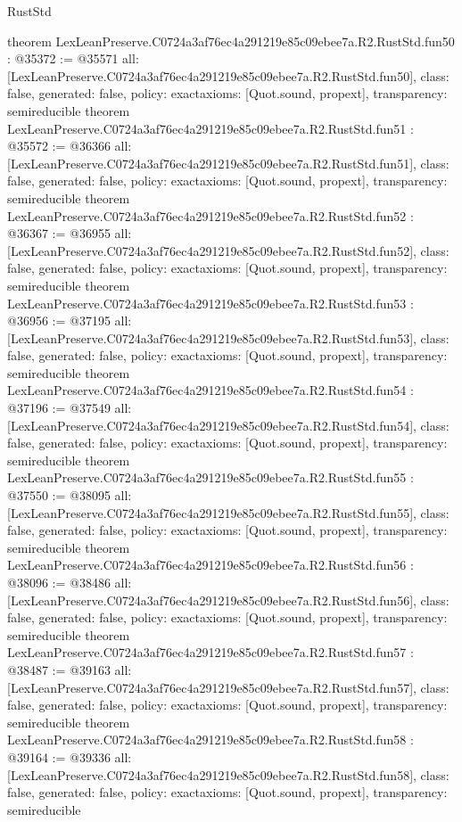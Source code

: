 \begin{lexlean}{RustStd}
\begin{coremodule}
{}
theorem LexLeanPreserve.C0724a3af76ec4a291219e85c09ebee7a.R2.RustStd.fun50 : @35372 := @35571 {
  all: [LexLeanPreserve.C0724a3af76ec4a291219e85c09ebee7a.R2.RustStd.fun50],
  class: false,
  generated: false,
  policy: exact{axioms: [Quot.sound, propext]},
  transparency: semireducible
}
theorem LexLeanPreserve.C0724a3af76ec4a291219e85c09ebee7a.R2.RustStd.fun51 : @35572 := @36366 {
  all: [LexLeanPreserve.C0724a3af76ec4a291219e85c09ebee7a.R2.RustStd.fun51],
  class: false,
  generated: false,
  policy: exact{axioms: [Quot.sound, propext]},
  transparency: semireducible
}
theorem LexLeanPreserve.C0724a3af76ec4a291219e85c09ebee7a.R2.RustStd.fun52 : @36367 := @36955 {
  all: [LexLeanPreserve.C0724a3af76ec4a291219e85c09ebee7a.R2.RustStd.fun52],
  class: false,
  generated: false,
  policy: exact{axioms: [Quot.sound, propext]},
  transparency: semireducible
}
theorem LexLeanPreserve.C0724a3af76ec4a291219e85c09ebee7a.R2.RustStd.fun53 : @36956 := @37195 {
  all: [LexLeanPreserve.C0724a3af76ec4a291219e85c09ebee7a.R2.RustStd.fun53],
  class: false,
  generated: false,
  policy: exact{axioms: [Quot.sound, propext]},
  transparency: semireducible
}
theorem LexLeanPreserve.C0724a3af76ec4a291219e85c09ebee7a.R2.RustStd.fun54 : @37196 := @37549 {
  all: [LexLeanPreserve.C0724a3af76ec4a291219e85c09ebee7a.R2.RustStd.fun54],
  class: false,
  generated: false,
  policy: exact{axioms: [Quot.sound, propext]},
  transparency: semireducible
}
theorem LexLeanPreserve.C0724a3af76ec4a291219e85c09ebee7a.R2.RustStd.fun55 : @37550 := @38095 {
  all: [LexLeanPreserve.C0724a3af76ec4a291219e85c09ebee7a.R2.RustStd.fun55],
  class: false,
  generated: false,
  policy: exact{axioms: [Quot.sound, propext]},
  transparency: semireducible
}
theorem LexLeanPreserve.C0724a3af76ec4a291219e85c09ebee7a.R2.RustStd.fun56 : @38096 := @38486 {
  all: [LexLeanPreserve.C0724a3af76ec4a291219e85c09ebee7a.R2.RustStd.fun56],
  class: false,
  generated: false,
  policy: exact{axioms: [Quot.sound, propext]},
  transparency: semireducible
}
theorem LexLeanPreserve.C0724a3af76ec4a291219e85c09ebee7a.R2.RustStd.fun57 : @38487 := @39163 {
  all: [LexLeanPreserve.C0724a3af76ec4a291219e85c09ebee7a.R2.RustStd.fun57],
  class: false,
  generated: false,
  policy: exact{axioms: [Quot.sound, propext]},
  transparency: semireducible
}
theorem LexLeanPreserve.C0724a3af76ec4a291219e85c09ebee7a.R2.RustStd.fun58 : @39164 := @39336 {
  all: [LexLeanPreserve.C0724a3af76ec4a291219e85c09ebee7a.R2.RustStd.fun58],
  class: false,
  generated: false,
  policy: exact{axioms: [Quot.sound, propext]},
  transparency: semireducible
}
\end{coremodule}
\end{lexlean}
